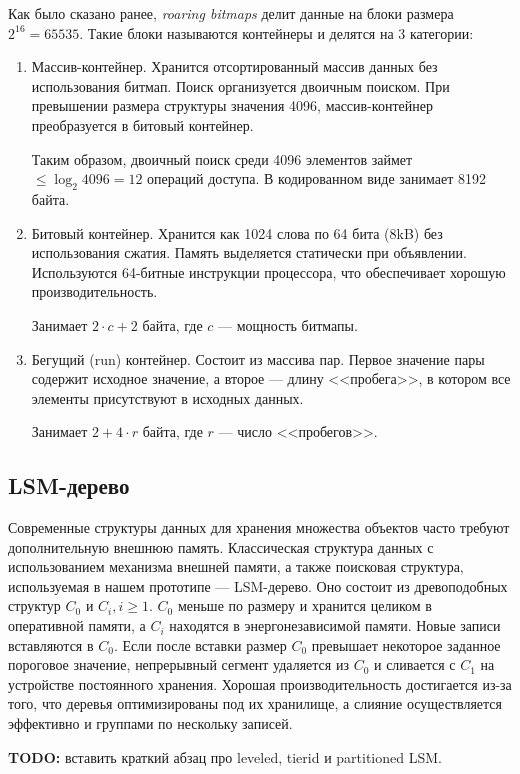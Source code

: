 Как было сказано ранее, \textit{roaring bitmaps} делит данные на блоки размера
$2^{16} = 65535$. Такие блоки называются контейнеры и делятся на 3 категории:
\begin{enumerate}
    \label{bitmap}
    \item Массив-контейнер. Хранится отсортированный массив данных без использования
    битмап. Поиск организуется двоичным поиском. При превышении размера структуры
    значения 4096, массив-контейнер преобразуется в битовый контейнер.

    Таким образом, двоичный поиск среди 4096 элементов займет $\leq \log_2{4096}
    = 12$ операций доступа. В кодированном виде занимает 8192 байта.
    \item Битовый контейнер. Хранится как 1024 слова по 64 бита (8kB) без
    использования сжатия. Память выделяется статически при объявлении. Используются
    64-битные инструкции процессора, что обеспечивает хорошую производительность.

    Занимает $2 \cdot c+2$ байта, где $c$ — мощность битмапы.
    \item Бегущий (run) контейнер. Состоит из массива пар. Первое значение пары
    содержит исходное значение, а второе — длину <<пробега>>, в котором все элементы
    присутствуют в исходных данных.

    Занимает $2+4\cdot r$ байта, где $r$ — число <<пробегов>>.
\end{enumerate}

\subsection{LSM-дерево}

Современные структуры данных для хранения множества объектов часто требуют
дополнительную внешнюю память. Классическая структура данных с использованием механизма
внешней памяти, а также поисковая структура, используемая в нашем прототипе —
LSM-дерево. Оно состоит из древоподобных структур $C_0$ и $C_i, i \ge 1$.
$C_0$ меньше по размеру и хранится
целиком в оперативной памяти, а $C_i$ находятся в энергонезависимой памяти. Новые
записи вставляются в $C_0$. Если после вставки размер $C_0$ превышает некоторое заданное
пороговое значение, непрерывный сегмент удаляется из $C_0$ и сливается с $C_1$ на устройстве
постоянного хранения. Хорошая производительность достигается из-за того, что деревья
оптимизированы под их хранилище, а слияние осуществляется эффективно и группами по
нескольку записей.

\textbf{TODO:} вставить краткий абзац про leveled, tierid и partitioned LSM.

